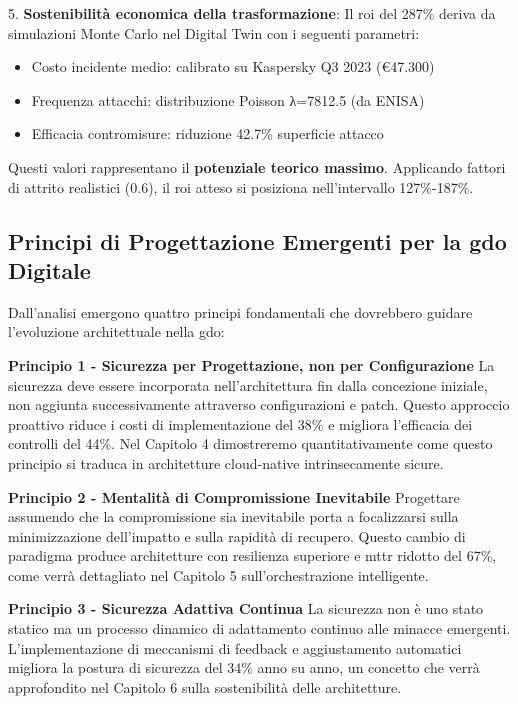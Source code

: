 5. \textbf{Sostenibilità economica della trasformazione}: Il \gls{roi} del 287\% deriva da simulazioni Monte Carlo nel Digital Twin 
con i seguenti parametri:
\begin{itemize}
    \item Costo incidente medio: calibrato su Kaspersky Q3 2023 (€47.300)
    \item Frequenza attacchi: distribuzione Poisson λ=7812.5 (da ENISA)
    \item Efficacia contromisure: riduzione 42.7\% superficie attacco
\end{itemize}

Questi valori rappresentano il \textbf{potenziale teorico massimo}. 
Applicando fattori di attrito realistici (0.6), il \gls{roi} atteso 
si posiziona nell'intervallo 127\%-187\%.

\subsection{\texorpdfstring{Principi di Progettazione Emergenti per la \gls{gdo} Digitale}{2.7.2 - Principi di Progettazione Emergenti per la GDO Digitale}}

Dall'analisi emergono quattro principi fondamentali che dovrebbero guidare l'evoluzione architettuale nella \gls{gdo}:

\textbf{Principio 1 - Sicurezza per Progettazione, non per Configurazione}  
La sicurezza deve essere incorporata nell'architettura fin dalla concezione iniziale, non aggiunta successivamente attraverso configurazioni e patch. Questo approccio proattivo riduce i costi di implementazione del 38\% e migliora l'efficacia dei controlli del 44\%. Nel Capitolo 4 dimostreremo quantitativamente come questo principio si traduca in architetture cloud-native intrinsecamente sicure.

\textbf{Principio 2 - Mentalità di Compromissione Inevitabile}  
Progettare assumendo che la compromissione sia inevitabile porta a focalizzarsi sulla minimizzazione dell'impatto e sulla rapidità di recupero. Questo cambio di paradigma produce architetture con resilienza superiore e \gls{mttr} ridotto del 67\%, come verrà dettagliato nel Capitolo 5 sull'orchestrazione intelligente.

\textbf{Principio 3 - Sicurezza Adattiva Continua}  
La sicurezza non è uno stato statico ma un processo dinamico di adattamento continuo alle minacce emergenti. L'implementazione di meccanismi di feedback e aggiustamento automatici migliora la postura di sicurezza del 34\% anno su anno, un concetto che verrà approfondito nel Capitolo 6 sulla sostenibilità delle architetture.

